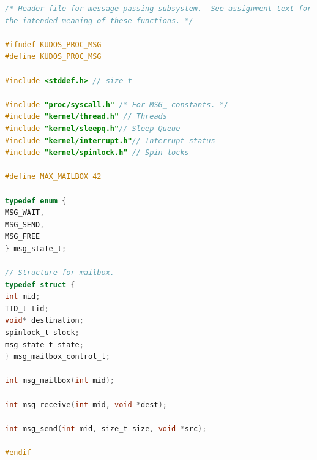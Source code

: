 \documentclass[11pt,a4paper]{article}
\theoremstyle{plain}
\theoremstyle{definition}
\theoremstyle{remark}
\numberwithin{equation}{section}
\begin{document}
\begin{lstlisting}[language=C,caption={msg.h},label={lst:msg.h}]
/* Header file for message passing subsystem.  See assignment text for
the intended meaning of these functions. */

#ifndef KUDOS_PROC_MSG
#define KUDOS_PROC_MSG

#include <stddef.h> // size_t

#include "proc/syscall.h" /* For MSG_ constants. */
#include "kernel/thread.h" // Threads
#include "kernel/sleepq.h"// Sleep Queue
#include "kernel/interrupt.h"// Interrupt status
#include "kernel/spinlock.h" // Spin locks

#define MAX_MAILBOX 42

typedef enum {
MSG_WAIT,
MSG_SEND,
MSG_FREE
} msg_state_t;

// Structure for mailbox.
typedef struct {
int mid;
TID_t tid;
void* destination;
spinlock_t slock;
msg_state_t state;
} msg_mailbox_control_t;

int msg_mailbox(int mid);

int msg_receive(int mid, void *dest);

int msg_send(int mid, size_t size, void *src);

#endif

\end{lstlisting}
\end{document}
